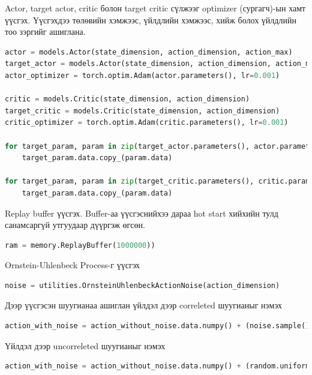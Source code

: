 \documentclass[12pt,A4]{report}
\begin{document}
Actor, target actor, critic болон target critic сүлжээг optimizer (сургагч)-ын хамт үүсгэх. Үүсгэхдээ төлөвийн хэмжээс, үйлдлийн хэмжээс, хийж болох үйлдлийн тоо зэргийг ашиглана.

\begin{lstlisting}[language=Python, caption=Actor critic сүлжээ үүсгэх, frame=single]
actor = models.Actor(state_dimension, action_dimension, action_max)
target_actor = models.Actor(state_dimension, action_dimension, action_max)
actor_optimizer = torch.optim.Adam(actor.parameters(), lr=0.001)

critic = models.Critic(state_dimension, action_dimension)
target_critic = models.Critic(state_dimension, action_dimension)
critic_optimizer = torch.optim.Adam(critic.parameters(), lr=0.001)

for target_param, param in zip(target_actor.parameters(), actor.parameters()):
	target_param.data.copy_(param.data)

for target_param, param in zip(target_critic.parameters(), critic.parameters()):
    target_param.data.copy_(param.data)
\end{lstlisting}

Replay buffer үүсгэх. Buffer-аа үүсгэснийхээ дараа hot start хийхийн тулд санамсаргүй утгуудаар дүүргэж өгсөн.

\begin{lstlisting}[language=Python, caption=Replay buffer үүсгэх, frame=single]
ram = memory.ReplayBuffer(1000000))
\end{lstlisting}

Ornstein-Uhlenbeck Process-г үүсгэх

\begin{lstlisting}[language=Python, caption=Шуугиан үүсгэх, frame=single]
noise = utilities.OrnsteinUhlenbeckActionNoise(action_dimension)
\end{lstlisting}

Дээр үүсгэсэн шуугианаа ашиглан үйлдэл дээр correleted шуугианыг нэмэх

\begin{lstlisting}[language=Python, caption=Үйлдэл дээр шуугиан нэмэх, frame=single]
action_with_noise = action_without_noise.data.numpy() + (noise.sample() * action_max)
\end{lstlisting}

Үйлдэл дээр uncorreleted шуугианыг нэмэх

\begin{lstlisting}[language=Python, caption=Үйлдэл дээр шуугиан нэмэх, frame=single]
action_with_noise = action_without_noise.data.numpy() + (random.uniform(-0.2, 0.2) * action_max)
\end{lstlisting}
\end{document}

